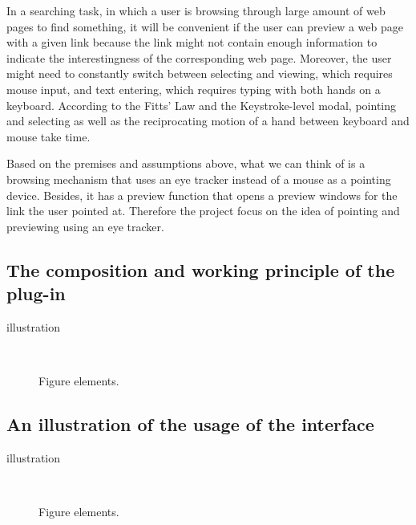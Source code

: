\documentclass[english]{tktltiki}
\begin{document}
In a searching task, in which a user is browsing through large amount of web pages to find something, it will be convenient if the user can preview a web page with a given link because the link might not contain enough information to indicate the interestingness of the corresponding web page. Moreover, the user might need to constantly switch between selecting and viewing, which requires mouse input, and text entering, which requires typing with both hands on a keyboard. According to the Fitts' Law and the Keystroke-level modal,\cite{Fitts64}\cite{Card:1980:KMU:358886.358895} pointing and selecting as well as the reciprocating motion of a hand between keyboard and mouse take time. 

Based on the premises and assumptions above, what we can think of is a browsing mechanism that uses an eye tracker instead of a mouse as a pointing device. Besides, it has a preview function that opens a preview windows for the link the user pointed at. Therefore the project focus on the idea of pointing and previewing using an eye tracker.  



\subsection{The composition and working principle of the plug-in}

{illustration}
\begin{figure}[h]
\ \newline
\begin{center}
\caption{Figure elements.}
\label{kuvaesimerkki}
\end{center}
\end{figure}

\subsection{An illustration of the usage of the interface}

{illustration}
\begin{figure}[h]
\ \newline
\begin{center}
\caption{Figure elements.}
\label{kuvaesimerkki}
\end{center}
\end{figure}
\end{document}

